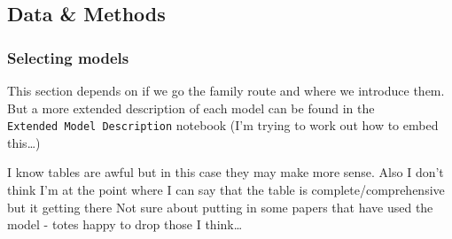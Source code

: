 \documentclass[
]{agujournal2019}
\begin{document}
\subsection{Data \& Methods}\label{sec-data-methods}

\subsubsection{Selecting models}\label{selecting-models}

This section depends on if we go the family route and where we introduce
them. But a more extended description of each model can be found in the
\texttt{Extended\ Model\ Description} notebook (I'm trying to work out
how to embed this\ldots)

I know tables are awful but in this case they may make more sense. Also
I don't think I'm at the point where I can say that the table is
complete/comprehensive but it getting there Not sure about putting in
some papers that have used the model - totes happy to drop those I
think\ldots{}
\end{document}
